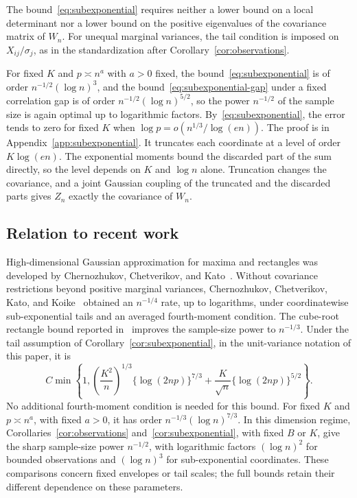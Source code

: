 \documentclass[11pt,letterpaper]{article}
\theoremstyle{remark}
\begin{document}
The bound~\eqref{eq:subexponential} requires neither a lower bound on a
local determinant nor a lower bound on the positive eigenvalues of the
covariance matrix of \(W_n\). For unequal marginal variances, the tail
condition is imposed on \(X_{ij}/\sigma_j\), as in the standardization after
Corollary~\ref{cor:observations}.

For fixed \(K\) and \(p\asymp n^a\) with \(a>0\) fixed, the
bound~\eqref{eq:subexponential} is of order \(n^{-1/2}(\log n)^3\), and the
bound~\eqref{eq:subexponential-gap} under a fixed correlation gap is of order
\(n^{-1/2}(\log n)^{5/2}\), so the power \(n^{-1/2}\) of the sample size is
again optimal up to logarithmic factors. By~\eqref{eq:subexponential}, the error
tends to zero for fixed \(K\) when \(\log p=o(n^{1/3}/\log(en))\).
The proof is in Appendix~\ref{app:subexponential}. It truncates each coordinate
at a level of order \(K\log(en)\). The exponential moments bound the discarded
part of the sum directly, so the level depends on \(K\) and \(\log n\) alone. Truncation
changes the covariance, and a joint Gaussian coupling of the truncated and the
discarded parts gives \(Z_n\) exactly the covariance of \(W_n\).

\subsection{Relation to recent work}\label{sec:literature}
High-dimensional Gaussian approximation for maxima and rectangles was
developed by Chernozhukov, Chetverikov, and Kato~\cite{CCK2013,CCK2017}.
Without covariance restrictions beyond positive marginal variances,
Chernozhukov, Chetverikov, Kato, and Koike~\cite[Theorem~2.1]{CCKK2022}
obtained an \(n^{-1/4}\) rate, up to logarithms, under coordinatewise
sub-exponential tails and an averaged fourth-moment condition.
The cube-root rectangle bound reported in~\cite[Theorem~1 and Section~5]{GaoZhang} improves the sample-size power to \(n^{-1/3}\). Under the tail assumption of Corollary~\ref{cor:subexponential}, in the unit-variance notation of this paper, it is
\begin{equation*}
 C\min\left\{1,
 \left(\frac{K^2}{n}\right)^{1/3}\{\log(2np)\}^{7/3}
 +\frac K{\sqrt n}\{\log(2np)\}^{5/2}\right\}.
\end{equation*}
No additional fourth-moment condition is needed for this bound.
For fixed \(K\) and \(p\asymp n^a\), with fixed \(a>0\), it has
order \(n^{-1/3}(\log n)^{7/3}\). In this dimension regime,
Corollaries~\ref{cor:observations} and~\ref{cor:subexponential}, with
fixed \(B\) or \(K\), give the sharp sample-size power
\(n^{-1/2}\), with logarithmic factors \((\log n)^2\) for bounded
observations and \((\log n)^3\) for sub-exponential coordinates.
These comparisons concern fixed envelopes or tail scales; the full
bounds retain their different dependence on these parameters.
\end{document}
